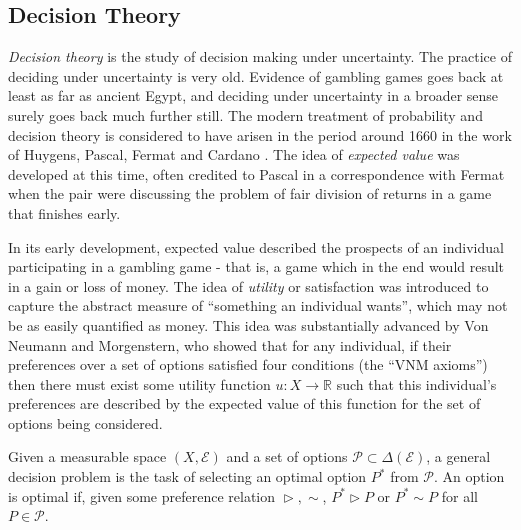 
\subsection{Decision Theory} \label{sec:decision_theory}

\emph{Decision theory} is the study of decision making under uncertainty. The practice of deciding under uncertainty is very old. Evidence of gambling games goes back at least as far as ancient Egypt\cite{hacking_emergence_2006}, and deciding under uncertainty in a broader sense surely goes back much further still. The modern treatment of probability and decision theory is considered to have arisen in the period around 1660 in the work of Huygens, Pascal, Fermat and Cardano \cite{hacking_emergence_2006}. The idea of \emph{expected value} was developed at this time, often credited to Pascal in a correspondence with Fermat when the pair were discussing the problem of fair division of returns in a game that finishes early. 

In its early development, expected value described the prospects of an individual participating in a gambling game - that is, a game which in the end would result in a gain or loss of money. The idea of \emph{utility} or satisfaction was introduced to capture the abstract measure of ``something an individual wants'', which may not be as easily quantified as money. This idea was substantially advanced by Von Neumann and Morgenstern, who showed that for any individual, if their preferences over a set of options satisfied four conditions (the ``VNM axioms'') then there must exist some utility function $u:X\to \mathbb{R}$ such that this individual's preferences are described by the expected value of this function for the set of options being considered\cite{von_neumann_theory_1944}.

\begin{definition}
Given a measurable space $(X,\mathcal{E})$ and a set of options $\mathcal{P}\subset \Delta(\mathcal{E})$, a general decision problem is the task of selecting an optimal option $P^*$ from $\mathcal{P}$. An option is optimal if, given some preference relation $\vartriangleright,\sim$, $P^*\vartriangleright P$ or $P^*\sim P$ for all $P\in \mathcal{P}$. 
\end{definition}

